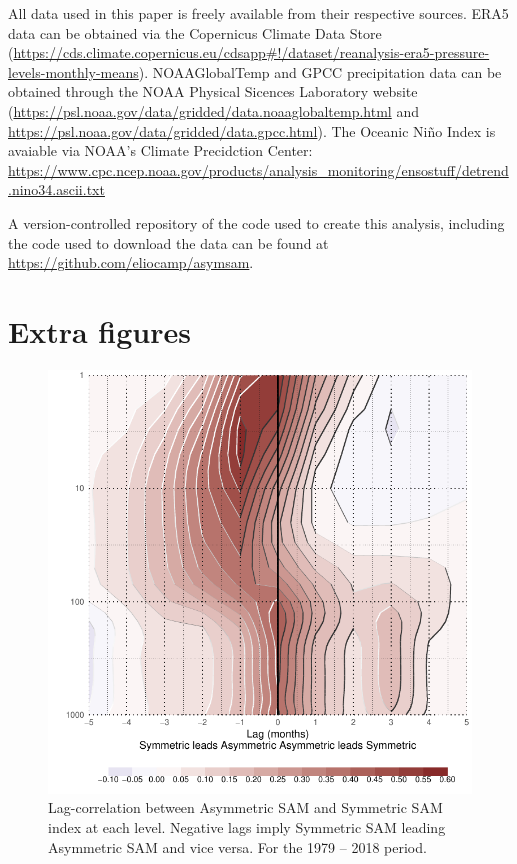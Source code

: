 \documentclass[smallextended]{svjour3}       %
\begin{document}
All data used in this paper is freely available from their respective sources. ERA5 data can be obtained via the Copernicus Climate Data Store (\url{https://cds.climate.copernicus.eu/cdsapp\#!/dataset/reanalysis-era5-pressure-levels-monthly-means}). NOAAGlobalTemp and GPCC precipitation data can be obtained through the NOAA Physical Sicences Laboratory website (\url{https://psl.noaa.gov/data/gridded/data.noaaglobaltemp.html} and \url{https://psl.noaa.gov/data/gridded/data.gpcc.html}). The Oceanic Niño Index is avaiable via NOAA's Climate Precidction Center: \url{https://www.cpc.ncep.noaa.gov/products/analysis_monitoring/ensostuff/detrend.nino34.ascii.txt}

A version-controlled repository of the code used to create this analysis, including the code used to download the data can be found at \url{https://github.com/eliocamp/asymsam}.

\newpage

\appendix


\hypertarget{extra-figures}{%
\section{Extra figures}\label{extra-figures}}

\newpage

\begin{figure}[ht]
\includegraphics{A1-1} \caption{Lag-correlation between Asymmetric SAM and Symmetric SAM index at each level. Negative lags imply Symmetric SAM leading Asymmetric SAM and vice versa. For the 1979 -- 2018 period.}\label{fig:A1}
\end{figure}
\end{document}
